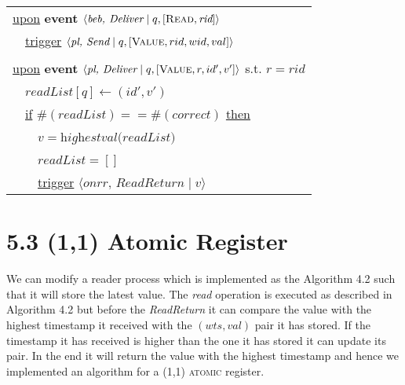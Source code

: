 \documentclass{article}
\begin{document}
\begin{adjustwidth}{2em}{2em}
\begin{center}
\begin{tabular}{l}
				\\
				\underline{upon} \textbf{event} $\langle \textit{beb, Deliver} \mid q, [\textsc{Read}, \textit{rid}] \rangle$ \\
				\ \ \underline{trigger} $\langle \textit{pl, Send} \mid q, [\textsc{Value}, rid, wid, val] \rangle$ \\
				\\
				\underline{upon} \textbf{event} $\langle \textit{pl, Deliver} \mid q, [\textsc{Value}, r, id', v'] \rangle$ s.t. $r = rid$\\
				\ \ $readList[q] \leftarrow (id', v')$ \\
				\ \ \underline{if} $\#(readList) == \#(correct)$ \underline{then} \\
				\ \ \ \ $v = \textit{highestval(readList)}$ \\
				\ \ \ \ $readList = []$ \\
				\ \ \ \ \underline{trigger} $\langle \textit{onrr, ReadReturn} \mid v \rangle$
				
			\end{tabular}
		\end{center}
	\end{adjustwidth}
	
	\section*{5.3 (1,1) Atomic Register}
	\begin{adjustwidth}{2em}{2em}
		We can modify a reader process which is implemented as the Algorithm 4.2 such that it will store the latest value. The \textit{read} operation is executed as described in Algorithm 4.2 but before the \textit{ReadReturn} it can compare the value with the highest timestamp it received with the $(wts, val)$ pair it has stored. If the timestamp it has received is higher than the one it has stored it can update its pair. In the end it will return the value with the highest timestamp and hence we implemented an algorithm for a (1,1) \textsc{atomic} register.
	\end{adjustwidth}
\end{document}
